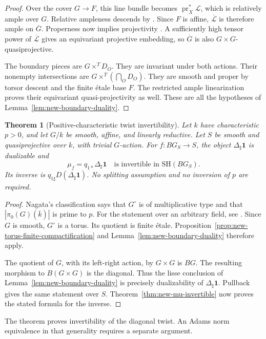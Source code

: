 \documentclass[11pt,reqno]{amsart}
\newtheorem{theorem}{Theorem}[section]
\theoremstyle{definition}
\theoremstyle{remark}
\theoremstyle{plain}
\numberwithin{equation}{section}
\newcommand{\SH}{\mathrm{SH}}
\newcommand{\one}{\mathbf 1}
\begin{document}
\begin{proof}
Over the cover \(G\to F\), this line bundle becomes
\(\operatorname{pr}_X^*\mathcal L\), which is relatively ample over \(G\).
Relative ampleness descends by \cite[Tag~0D2P]{Stacks}.
Since \(F\) is affine, \(\overline{\mathcal L}\) is therefore ample on
\(\overline G\).
Properness now implies projectivity \cite[Tag~0B44]{Stacks}.
A sufficiently high tensor power of \(\overline{\mathcal L}\) gives an
equivariant projective embedding, so \(\overline G\) is also
\(G\times G\)-quasiprojective.

The boundary pieces are \(G\times^T D_O\).
They are invariant under both actions.
Their nonempty intersections are \(G\times^T(\bigcap_O D_O)\).
They are smooth and proper by torsor descent and the finite \'{e}tale
base \(F\).
The restricted ample linearization proves their equivariant
quasi-projectivity as well.
These are all the hypotheses of Lemma~\ref{lem:new-boundary-duality}.
\end{proof}

\begin{theorem}[Positive-characteristic twist invertibility]
\label{thm:new-charp-invertibility}
Let \(k\) have characteristic \(p>0\), and let \(G/k\) be smooth,
affine, and linearly reductive.
Let \(S\) be smooth and quasiprojective over \(k\), with trivial
\(G\)-action. For \(f:BG_S\to S\), the object
\(\Delta_\sharp\one\) is dualizable and
\[
 \mu_f=q_{1*}\Delta_\sharp\one
 \quad\text{is invertible in }\SH(BG_S).
\]
Its inverse is \(q_{1\sharp}D(\Delta_\sharp\one)\).
No splitting assumption and no inversion of \(p\) are required.
\end{theorem}
\begin{proof}
Nagata's classification says that \(G^\circ\) is of multiplicative type
and that \(|\pi_0(G)(\overline{k})|\) is prime to \(p\).
For the statement over an arbitrary field, see
\cite[Definition~1.1 and Theorem~1.2]{HallRydhGroups}.
Since \(G\) is smooth, \(G^\circ\) is a torus.
Its quotient is finite \'{e}tale.
Proposition~\ref{prop:new-torus-finite-compactification} and
Lemma~\ref{lem:new-boundary-duality} therefore apply.

The quotient of \(G\), with its left-right action, by \(G\times G\)
is \(BG\).
The resulting morphism to \(B(G\times G)\) is the diagonal.
Thus the lisse conclusion of Lemma~\ref{lem:new-boundary-duality}
is precisely dualizability of \(\Delta_\sharp\one\).
Pullback gives the same statement over \(S\).
Theorem~\ref{thm:new-mu-invertible} now proves the stated formula
for the inverse.
\end{proof}

The theorem proves invertibility of the diagonal twist.
An Adams norm equivalence in that generality requires a separate argument.

\enlargethispage{2\baselineskip}


\end{document}
